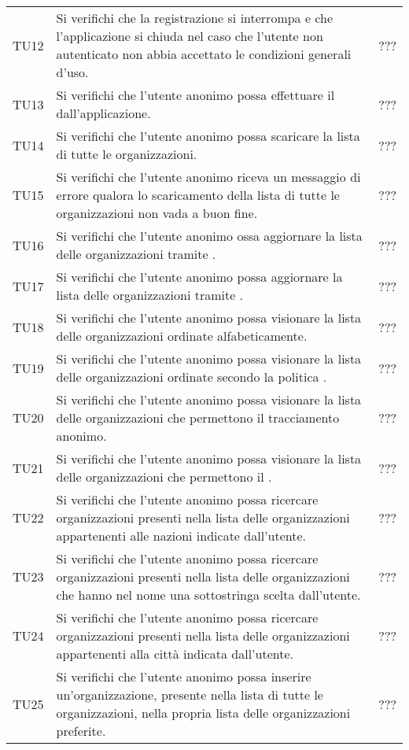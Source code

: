 {\begin{longtable}{ c C{13cm} C{1cm}}
TU12 & Si verifichi che la registrazione si interrompa e che l'applicazione si chiuda nel caso che l'utente non autenticato non abbia accettato le condizioni generali d'uso. & ??? \\
TU13 & Si verifichi che l'utente anonimo possa effettuare il  dall'applicazione. & ??? \\
TU14 & Si verifichi che l'utente anonimo possa scaricare la lista di tutte le organizzazioni. & ??? \\
TU15 & Si verifichi che l'utente anonimo riceva un messaggio di errore qualora lo scaricamento della lista di tutte le organizzazioni non vada a buon fine. & ??? \\
TU16 & Si verifichi che l'utente anonimo ossa aggiornare la lista delle organizzazioni tramite . & ??? \\
TU17 & Si verifichi che l'utente anonimo possa aggiornare la lista delle organizzazioni tramite . & ??? \\
TU18 & Si verifichi che l'utente anonimo possa visionare la lista delle organizzazioni ordinate alfabeticamente. & ??? \\
TU19 & Si verifichi che l'utente anonimo possa visionare la lista delle organizzazioni ordinate secondo la politica . & ??? \\
TU20 & Si verifichi che l'utente anonimo possa visionare la lista delle organizzazioni che permettono il tracciamento anonimo. & ??? \\
TU21 & Si verifichi che l'utente anonimo possa visionare la lista delle organizzazioni che permettono il . & ??? \\
TU22 & Si verifichi che l'utente anonimo possa ricercare organizzazioni presenti nella lista delle organizzazioni appartenenti alle nazioni indicate dall'utente. & ??? \\
TU23 & Si verifichi che l'utente anonimo possa ricercare organizzazioni presenti nella lista delle organizzazioni che hanno nel nome una sottostringa scelta dall'utente. & ??? \\
TU24 & Si verifichi che l'utente anonimo possa ricercare organizzazioni presenti nella lista delle organizzazioni appartenenti alla città indicata dall'utente. & ??? \\
TU25 & Si verifichi che l'utente anonimo possa inserire un'organizzazione, presente nella lista di tutte le organizzazioni, nella propria lista delle organizzazioni preferite. & ??? \\

\end{longtable}}
